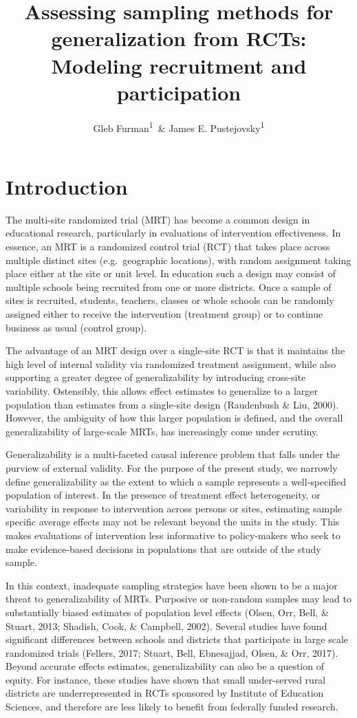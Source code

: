 \documentclass[man,floatsintext]{apa6}
\title{Assessing sampling methods for generalization from RCTs: Modeling recruitment and participation}
\author{Gleb Furman\textsuperscript{1}~\& James E. Pustejovsky\textsuperscript{1}}
\date{}
\affiliation{
\vspace{0.5cm}
\textsuperscript{1} University of Texas at Austin}
\begin{document}
\maketitle

\hypertarget{introduction}{%
\section{Introduction}\label{introduction}}

The multi-site randomized trial (MRT) has become a common design in educational research, particularly in evaluations of intervention effectiveness. In essence, an MRT is a randomized control trial (RCT) that takes place across multiple distinct sites (e.g.~geographic locations), with random assignment taking place either at the site or unit level. In education such a design may consist of multiple schools being recruited from one or more districts. Once a sample of sites is recruited, students, teachers, classes or whole schools can be randomly assigned either to receive the intervention (treatment group) or to continue business as usual (control group).

The advantage of an MRT design over a single-site RCT is that it maintains the high level of internal validity via randomized treatment assignment, while also supporting a greater degree of generalizability by introducing cross-site variability. Ostensibly, this allows effect estimates to generalize to a larger population than estimates from a single-site design (Raudenbush \& Liu, 2000). However, the ambiguity of how this larger population is defined, and the overall generalizability of large-scale MRTs, has increasingly come under scrutiny.

Generalizability is a multi-faceted causal inference problem that falls under the purview of external validity. For the purpose of the present study, we narrowly define generalizability as the extent to which a sample represents a well-specified population of interest. In the presence of treatment effect heterogeneity, or variability in response to intervention across persons or sites, estimating sample specific average effects may not be relevant beyond the units in the study. This makes evaluations of intervention less informative to policy-makers who seek to make evidence-based decisions in populations that are outside of the study sample.

In this context, inadequate sampling strategies have been shown to be a major threat to generalizability of MRTs. Purposive or non-random samples may lead to substantially biased estimates of population level effects (Olsen, Orr, Bell, \& Stuart, 2013; Shadish, Cook, \& Campbell, 2002). Several studies have found significant differences between schools and districts that participate in large scale randomized trials (Fellers, 2017; Stuart, Bell, Ebnesajjad, Olsen, \& Orr, 2017). Beyond accurate effects estimates, generalizability can also be a question of equity. For instance, these studies have shown that small under-served rural districts are underrepresented in RCTs sponsored by Institute of Education Sciences, and therefore are less likely to benefit from federally funded research.
\end{document}
